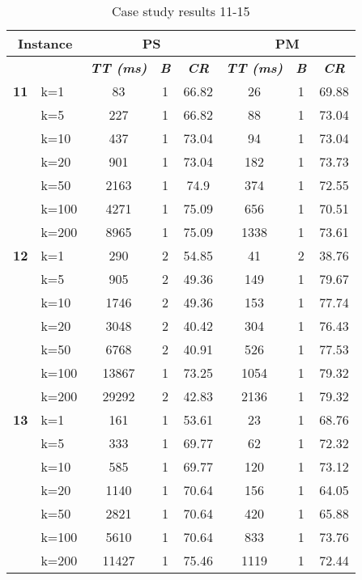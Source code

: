     \begin{table}[htbp]
    \caption{Case study results 11-15}
    \centering
    \begin{tabular}{|l|l|c|c|c|c|c|c|}
    \hline
    \multicolumn{ 2}{|c|}{\textbf{Instance}} & \multicolumn{ 3}{c|}{\textbf{PS}} & \multicolumn{ 3}{c|}{\textbf{PM}} \\ \hline
    \multicolumn{ 2}{|l|}{} & \textbf{\textit{TT (ms)}} & \textbf{\textit{B}} & \textbf{\textit{CR}} & \textbf{\textit{TT (ms)}} & \textbf{\textit{B}} & \textbf{\textit{CR}} \\ \hline
    \multicolumn{1}{|r|}{\textbf{11}} & k=1 & 83 & 1 & 66.82 & 26 & 1 & 69.88 \\ 
     & k=5 & 227 & 1 & 66.82 & 88 & 1 & 73.04 \\ 
     & k=10 & 437 & 1 & 73.04 & 94 & 1 & 73.04 \\ 
     & k=20 & 901 & 1 & 73.04 & 182 & 1 & 73.73 \\ 
     & k=50 & 2163 & 1 & 74.9 & 374 & 1 & 72.55 \\ 
     & k=100 & 4271 & 1 & 75.09 & 656 & 1 & 70.51 \\ 
     & k=200 & 8965 & 1 & 75.09 & 1338 & 1 & 73.61 \\ \hline
    \multicolumn{1}{|r|}{\textbf{12}} & k=1 & 290 & 2 & 54.85 & 41 & 2 & 38.76 \\ 
     & k=5 & 905 & 2 & 49.36 & 149 & 1 & 79.67 \\ 
     & k=10 & 1746 & 2 & 49.36 & 153 & 1 & 77.74 \\ 
     & k=20 & 3048 & 2 & 40.42 & 304 & 1 & 76.43 \\ 
     & k=50 & 6768 & 2 & 40.91 & 526 & 1 & 77.53 \\ 
     & k=100 & 13867 & 1 & 73.25 & 1054 & 1 & 79.32 \\ 
     & k=200 & 29292 & 2 & 42.83 & 2136 & 1 & 79.32 \\ \hline
    \multicolumn{1}{|r|}{\textbf{13}} & k=1 & 161 & 1 & 53.61 & 23 & 1 & 68.76 \\ 
     & k=5 & 333 & 1 & 69.77 & 62 & 1 & 72.32 \\ 
     & k=10 & 585 & 1 & 69.77 & 120 & 1 & 73.12 \\ 
     & k=20 & 1140 & 1 & 70.64 & 156 & 1 & 64.05 \\ 
     & k=50 & 2821 & 1 & 70.64 & 420 & 1 & 65.88 \\ 
     & k=100 & 5610 & 1 & 70.64 & 833 & 1 & 73.76 \\ 
     & k=200 & 11427 & 1 & 75.46 & 1119 & 1 & 72.44 \\ \hline

\end{tabular}
\end{table}
